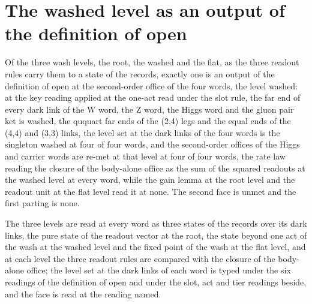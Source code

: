 \section{The washed level as an output of the definition of open}\label{mod:I-1-D541156-wslv-t1}
\begin{chtheorem}\label{box:I-1-D541156-wslv-t1:1}
Of the three wash levels, the root, the washed and the flat, as the three readout rules carry them to a state of the records, exactly one is an output of the definition of open at the second-order office of the four words, the level washed: at the key reading applied at the one-act read under the slot rule, the far end of every dark link of the W word, the Z word, the Higgs word and the gluon pair ket is washed, the ququart far ends of the (2,4) legs and the equal ends of the (4,4) and (3,3) links, the level set at the dark links of the four words is the singleton washed at four of four words, and the second-order offices of the Higgs and carrier words are re-met at that level at four of four words, the rate law reading the closure of the body-alone office as the sum of the squared readouts at the washed level at every word, while the gain lemma at the root level and the readout unit at the flat level read it at none. The second face is unmet and the first parting is none.
\end{chtheorem}
The three levels are read at every word as three states of the records over its dark links, the pure state of the readout vector at the root, the state beyond one act of the wash at the washed level and the fixed point of the wash at the flat level, and at each level the three readout rules are compared with the closure of the body-alone office; the level set at the dark links of each word is typed under the six readings of the definition of open and under the slot, act and tier readings beside, and the face is read at the reading named.

